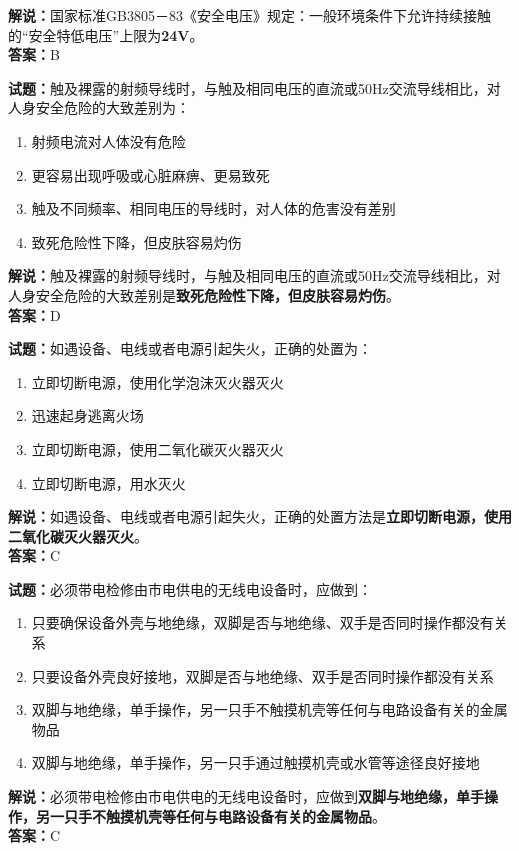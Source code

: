 \documentclass{ctexbook}
\begin{document}
\noindent\textbf{解说：}国家标准GB3805－83《安全电压》规定：一般环境条件下允许持续接触的“安全特低电压”上限为\textbf{24V}。\\\noindent\textbf{答案：}B%


\bigskip


\noindent\textbf{试题：}触及裸露的射频导线时，与触及相同电压的直流或50Hz交流导线相比，对人身安全危险的大致差别为：
\begin{enumerate}[leftmargin=3em]
	\item 射频电流对人体没有危险
	\item 更容易出现呼吸或心脏麻痹、更易致死
	\item 触及不同频率、相同电压的导线时，对人体的危害没有差别
	\item 致死危险性下降，但皮肤容易灼伤
\end{enumerate}
\noindent\textbf{解说：}触及裸露的射频导线时，与触及相同电压的直流或50Hz交流导线相比，对人身安全危险的大致差别是\textbf{致死危险性下降，但皮肤容易灼伤}。\\\noindent\textbf{答案：}D

\bigskip


\noindent\textbf{试题：}如遇设备、电线或者电源引起失火，正确的处置为：
\begin{enumerate}[leftmargin=3em]
	\item 立即切断电源，使用化学泡沫灭火器灭火
	\item 迅速起身逃离火场
	\item 立即切断电源，使用二氧化碳灭火器灭火
	\item 立即切断电源，用水灭火
\end{enumerate}
\noindent\textbf{解说：}如遇设备、电线或者电源引起失火，正确的处置方法是\textbf{立即切断电源，使用二氧化碳灭火器灭火}。\\\noindent\textbf{答案：}C

\bigskip


\noindent\textbf{试题：}必须带电检修由市电供电的无线电设备时，应做到：
\begin{enumerate}[leftmargin=3em]
	\item 只要确保设备外壳与地绝缘，双脚是否与地绝缘、双手是否同时操作都没有关系
	\item 只要设备外壳良好接地，双脚是否与地绝缘、双手是否同时操作都没有关系
	\item 双脚与地绝缘，单手操作，另一只手不触摸机壳等任何与电路设备有关的金属物品
	\item 双脚与地绝缘，单手操作，另一只手通过触摸机壳或水管等途径良好接地
\end{enumerate}
\noindent\textbf{解说：}必须带电检修由市电供电的无线电设备时，应做到\textbf{双脚与地绝缘，单手操作，另一只手不触摸机壳等任何与电路设备有关的金属物品}。\\\noindent\textbf{答案：}C
\bigskip
\end{document}
